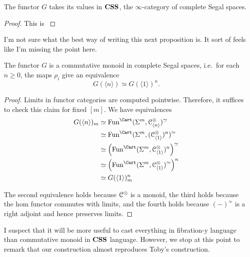 \documentclass[main.tex]{subfiles}
\begin{document}
\begin{proposition}
  The functor $G$ takes its values in $\mathbf{CSS}$, the $\infty$-category of complete Segal spaces.
\end{proposition}
\begin{proof}
  This is \cite[Prop.~8.1]{1409.0837}
\end{proof}

\begin{note}
  I'm not sure what the best way of writing this next proposition is. It sort of feels like I'm missing the point here.
\end{note}

\begin{proposition}
  The functor $G$ is a commutative monoid in complete Segal spaces, i.e.\ for each $n \geq 0$, the maps $\rho_{i}$ give an equivalence
  \begin{equation*}
    G(\langle n \rangle) \simeq G(\langle 1 \rangle)^{n}.
  \end{equation*}
\end{proposition}
\begin{proof}
  Limits in functor categories are computed pointwise. Therefore, it suffices to check this claim for fixed $[m]$.
  We have equivalences
  \begin{align*}
    G(\langle n \rangle)_{m} &\simeq \Fun^{\Cart}(\Sig^{m}, \category{C}^{\otimes}_{\langle n \rangle})^{\simeq} \\
    &\simeq \Fun^{\Cart}(\Sig^{m}, (\category{C}^{\otimes}_{\langle 1 \rangle})^{n})^{\simeq} \\
    &\simeq \left(\Fun^{\Cart}(\Sig^{m}, \category{C}^{\otimes}_{\langle 1 \rangle})^{n}\right)^{\simeq} \\
    &\simeq \left(\Fun^{\Cart}(\Sig^{m}, \category{C}^{\otimes}_{\langle 1 \rangle})^{\simeq}\right)^{n} \\
    &\simeq G(\langle 1 \rangle)_{m}^{n}
  \end{align*}

  The second equivalence holds because $\mathcal{C}^{\otimes}$ is a monoid, the third holds because the hom functor commutes with limits, and the fourth holds because $(-)^{\simeq}$ is a right adjoint and hence preserves limits.
\end{proof}

I suspect that it will be more useful to cast everything in fibration-y language than commutative monoid in $\mathbf{CSS}$ language. However, we stop at this point to remark that our construction almost reproduces Toby's construction.
\end{document}
